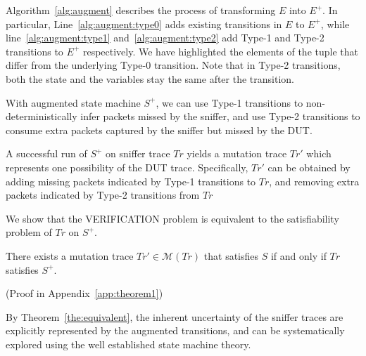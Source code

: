 Algorithm~\ref{alg:augment} describes the process of transforming $E$ into
$E^+$. In particular, Line~\ref{alg:augment:type0} adds existing transitions in
$E$ to $E^+$, while line~\ref{alg:augment:type1} and~\ref{alg:augment:type2} add
Type-1 and Type-2 transitions to $E^+$ respectively.  We have highlighted the
elements of the tuple that differ from the underlying Type-0 transition. Note
that in Type-2 transitions, both the state and the variables stay the same after
the transition.

With augmented state machine $S^+$, we can use Type-1 transitions to
non-deterministically infer packets missed by the sniffer, and use Type-2
transitions to consume extra packets captured by the sniffer but missed by the
DUT.

A successful run of $S^+$ on sniffer trace $Tr$ yields a mutation trace $Tr'$
which represents one possibility of the DUT trace. Specifically, $Tr'$ can be
obtained by adding missing packets indicated by Type-1 transitions to $Tr$, and
removing extra packets indicated by Type-2 transitions from $Tr$

We show that the VERIFICATION problem is equivalent to the
satisfiability problem of $Tr$ on $S^+$.

\begin{theorem}
  There exists a mutation trace $Tr' \in \mathcal{M}(Tr)$ that satisfies $S$ if
  and only if $Tr$ satisfies $S^+$.
 \label{the:equivalent}
\end{theorem}\vspace*{-2mm}(Proof in Appendix~\ref{app:theorem1})

By Theorem~\ref{the:equivalent}, the inherent uncertainty of the sniffer traces
are explicitly represented by the augmented transitions, and can be
systematically explored using the well established state machine theory.

